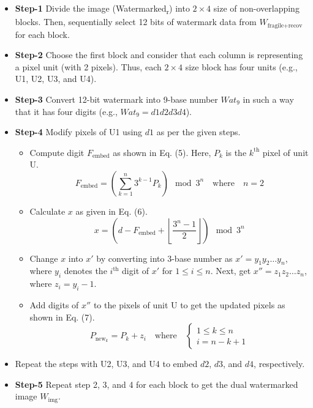 \documentclass{article}
\begin{document}
\begin{itemize}
    \item \textbf{Step-1} Divide the image (Watermarked\textsubscript{r}) into $2 \times 4$ size of non-overlapping blocks. Then, sequentially select 12 bits of watermark data from $W_{\text{fragile+recov}}$ for each block.
    
    \item \textbf{Step-2} Choose the first block and consider that each column is representing a pixel unit (with 2 pixels). Thus, each $2 \times 4$ size block has four units (e.g., U1, U2, U3, and U4).
    
    \item \textbf{Step-3} Convert 12-bit watermark into 9-base number $Wat_9$ in such a way that it has four digits (e.g., $Wat_9 = d1d2d3d4$).
    
    \item \textbf{Step-4} Modify pixels of U1 using $d1$ as per the given steps.
    \begin{itemize}
        \item Compute digit $F_{\text{embed}}$ as shown in Eq. (5). Here, $P_k$ is the $k^{\text{th}}$ pixel of unit U.
        \[
        F_{\text{embed}} = \left( \sum_{k=1}^n 3^{k-1} P_k \right) \mod 3^n \quad \text{where} \quad n = 2
        \]
        
        \item Calculate $x$ as given in Eq. (6).
        \[
        x = \left( d - F_{\text{embed}} + \left\lfloor \frac{3^n - 1}{2} \right\rfloor \right) \mod 3^n
        \]
        
        \item Change $x$ into $x'$ by converting into 3-base number as $x' = y_1 y_2 \ldots y_n$, where $y_i$ denotes the $i^{\text{th}}$ digit of $x'$ for $1 \leq i \leq n$. Next, get $x'' = z_1 z_2 \ldots z_n$, where $z_i = y_i - 1$.
        
        \item Add digits of $x''$ to the pixels of unit U to get the updated pixels as shown in Eq. (7).
        \[
        P_{\text{new}_k} = P_k + z_i \quad \text{where} \quad
        \begin{cases}
            1 \leq k \leq n \\
            i = n - k + 1
        \end{cases}
        \]
    \end{itemize}
    
    \item Repeat the steps with U2, U3, and U4 to embed $d2$, $d3$, and $d4$, respectively.
    
    \item \textbf{Step-5} Repeat step 2, 3, and 4 for each block to get the dual watermarked image $W_{\text{img}}$.
\end{itemize}
\end{document}
